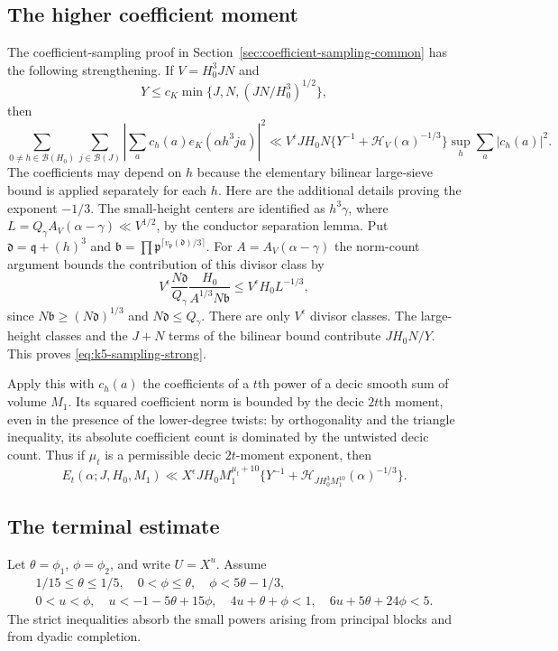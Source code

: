 \documentclass[11pt]{amsart}
\theoremstyle{definition}
\numberwithin{equation}{section}
\begin{document}
\subsection{The higher coefficient moment}
The coefficient-sampling proof in Section~\ref{sec:coefficient-sampling-common} has the
following strengthening.  If $V=H_0^3JN$ and
\[
 Y\le c_K\min\{J,N,(JN/H_0^3)^{1/2}\},
\]
then
\begin{equation}\label{eq:k5-sampling-strong}
 \sum_{0\ne h\in\mathcal B(H_0)}\sum_{j\in\mathcal B(J)}
 \left|\sum_a c_h(a)e_K(\alpha h^3ja)\right|^2
 \ll V^\epsilon JH_0N\{Y^{-1}+\mathcal H_V(\alpha)^{-1/3}\}
                      \sup_h\sum_a|c_h(a)|^2.
\end{equation}
The coefficients may depend on $h$ because the elementary bilinear
large-sieve bound is applied separately for each $h$.
Here are the additional details proving the exponent $-1/3$.
The small-height centers are identified as $h^3\gamma$, where
$L=Q_\gamma A_V(\alpha-\gamma)\ll V^{1/2}$, by the conductor separation
lemma.  Put $\mathfrak d=\mathfrak q+(h)^3$ and
$\mathfrak b=\prod\mathfrak p^{\lceil v_\mathfrak p(\mathfrak d)/3\rceil}$.
For $A=A_V(\alpha-\gamma)$ the norm-count argument bounds the contribution
of this divisor class by
\[
 V^\epsilon\frac{N\mathfrak d}{Q_\gamma}
       \frac{H_0}{A^{1/3}N\mathfrak b}
 \le V^\epsilon H_0L^{-1/3},
\]
since $N\mathfrak b\ge(N\mathfrak d)^{1/3}$ and
$N\mathfrak d\le Q_\gamma$.
There are only $V^\epsilon$ divisor classes.  The large-height classes and
the $J+N$ terms of the bilinear bound contribute $JH_0N/Y$.
This proves \eqref{eq:k5-sampling-strong}.

Apply this with $c_h(a)$ the coefficients of a $t$th power of a decic smooth
sum of volume $M_1$.  Its squared coefficient norm is bounded by the decic
$2t$th moment, even in the presence of the lower-degree twists: by
orthogonality and the triangle inequality, its absolute coefficient count
is dominated by the untwisted decic count.  Thus if $\mu_t$ is a permissible
decic $2t$-moment exponent, then
\[
 E_t(\alpha;J,H_0,M_1)
 \ll X^\epsilon JH_0M_1^{\mu_t+10}
             \{Y^{-1}+\mathcal H_{JH_0^3M_1^{10}}(\alpha)^{-1/3}\}.
\]

\subsection{The terminal estimate}
Let $\theta=\phi_1$, $\phi=\phi_2$, and write $U=X^u$.  Assume
\begin{gather}
 1/15\le\theta\le1/5,\quad 0<\phi\le\theta,\quad
 \phi<5\theta-1/3,\label{eq:k5-parameter1}\\
 0<u<\phi,\quad u<-1-5\theta+15\phi,\quad
 4u+\theta+\phi<1,\quad 6u+5\theta+24\phi<5.
 \label{eq:k5-parameter2}
\end{gather}
The strict inequalities absorb the small powers arising from principal
blocks and from dyadic completion.
\end{document}
